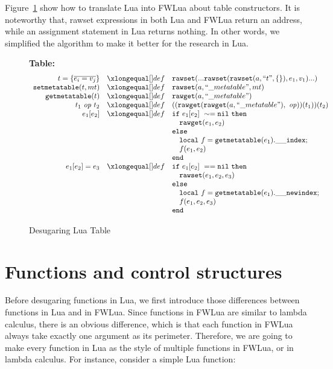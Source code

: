 Figure~\ref{fig:desLuaTable} show how to translate Lua into FWLua about table constructors. It is noteworthy that, rawset expressions in both Lua and FWLua return an address, while an assignment statement in Lua returns nothing. In other words, we simplified the algorithm to make it better for the research in Lua.

\begin{figure}
\caption{Desugaring Lua Table}\label{fig:desLuaTable}
{\bf Table:}\[
\begin{array}{rclcl}
\desugar{t = \{\overline{e_i = v_j}\}}{{\tt rawset}(...{\tt rawset}({\tt rawset}(a,``t", \{\}), e_1, v_1)...)}
\desugar{{\tt setmetatable}(t, mt)}{{\tt rawset}(a,``\_metatable", mt)}
\desugar{{\tt getmetatable}(t)}{{\tt rawget}(a,``\_metatable")}
\desugar{t_1~{\it op}~t_2}{(({\tt rawget}({\tt rawget}(a,``\_metatable"),~{\it op}))(t_1))(t_2)}
\desugar{e_1[e_2]}{{\tt if}~ e_1[e_2] ~\sim= {\tt nil} ~ {\tt then}\\}
\desugarline{ 
     \quad{\tt rawget}(e_1, e_2) ~\\
     {\tt else}\\
     \quad{\tt local}~f = {\tt getmetatable}(e_1).{\tt{\_}{\_}index};\\
     \quad f(e_1,e_2)\\ 
     {\tt end}
     }
\desugar{e_1[e_2]=e_3}{
    {\tt if}~ e_1[e_2] ~== {\tt nil} ~ {\tt then}\\
}
\desugarline{  
     \quad{\tt rawset}(e_1, e_2,e_3) ~\\
     {\tt else}\\
     \quad{\tt local}~f = {\tt getmetatable}(e_1).{\tt{\_}{\_}newindex};\\
     \quad f(e_1,e_2,e_3)\\ 
     {\tt end}\\
}
\end{array}\]
\end{figure}

\section{Functions and control structures}\label{sec:TraFunc}
Before desugaring functions in Lua, we first introduce those differences between functions in Lua and in FWLua. Since functions in FWLua are similar to lambda calculus, there is an obvious difference, which is that each function in FWLua always take exactly one argument as its perimeter. Therefore, we are going to make every function in Lua as the style of multiple functions in FWLua, or in lambda calculus. For instance, consider a simple Lua function:

